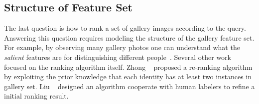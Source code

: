 \subsection{Structure of Feature Set} %
\label{sub:human-id-structure-set}
The last question is how to rank a set of gallery images according to the query. Answering this question requires modeling the structure of the gallery feature set. For example, by observing many gallery photos one can understand what the \emph{salient} features are for distinguishing different people~\cite{zhao2013unsupervised,zhao2017person}. Several other work focused on the ranking algorithm itself. Zhong \etal~\cite{zhong2017re} proposed a re-ranking algorithm by exploiting the prior knowledge that each identity has at least two instances in gallery set. Liu \etal~\cite{liu2013pop} designed an algorithm cooperate with human labelers to refine a initial ranking result.

